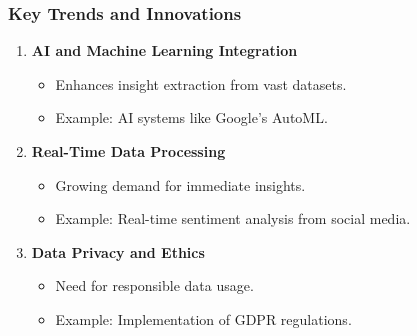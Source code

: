 \documentclass{beamer}
\begin{document}
\begin{frame}[fragile]
    \frametitle{Key Trends and Innovations}
    \begin{enumerate}
        \item \textbf{AI and Machine Learning Integration}
            \begin{itemize}
                \item Enhances insight extraction from vast datasets.
                \item Example: AI systems like Google’s AutoML.
            \end{itemize}

        \item \textbf{Real-Time Data Processing}
            \begin{itemize}
                \item Growing demand for immediate insights.
                \item Example: Real-time sentiment analysis from social media.
            \end{itemize}

        \item \textbf{Data Privacy and Ethics}
            \begin{itemize}
                \item Need for responsible data usage.
                \item Example: Implementation of GDPR regulations.
            \end{itemize}
    \end{enumerate}
\end{frame}
\end{document}
